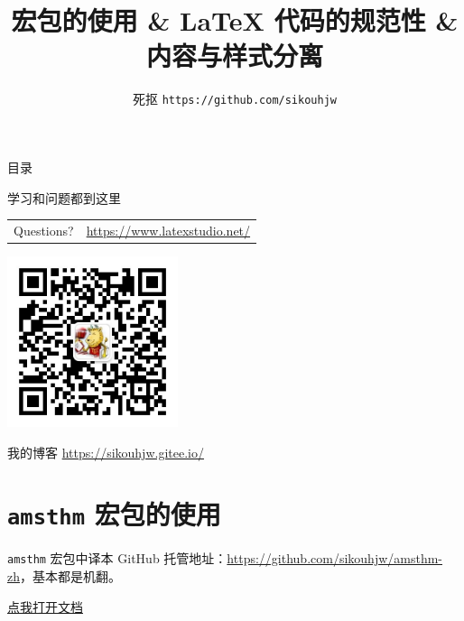 \documentclass[aspectratio=169,fontset=none]{ctexbeamer}
\title{\pkg{amsthm} 宏包的使用 \& \LaTeX{} 代码的规范性 \& 内容与样式分离}
\author{死抠 \texttt{https://github.com/sikouhjw}}
\newcommand{\pkg}[1]{\texttt{#1}}
\begin{document}
  \maketitle
  \begin{frame}{目录}
    \tableofcontents
  \end{frame}
  \begin{frame}[standout]{学习和问题都到这里}
    \begin{tabular}{cl}
      Questions? & \url{https://www.latexstudio.net/}
    \end{tabular}

    \includegraphics[width=5cm]{material/latex工作室.jpg}
  \end{frame}
  \begin{frame}[standout]{我的博客}
    \url{https://sikouhjw.gitee.io/}
  \end{frame}
  \section{\texorpdfstring{\pkg{amsthm}}{amsthm} 宏包的使用}
  \begin{frame}{\pkg{amsthm} 宏包中译本}
    GitHub 托管地址：\url{https://github.com/sikouhjw/amsthm-zh}，基本都是机翻。
    \begin{center}
      \href{material/amsthdoc-zh-v1.0.pdf}{点我打开文档}
    \end{center}
  \end{frame}
\end{document}
